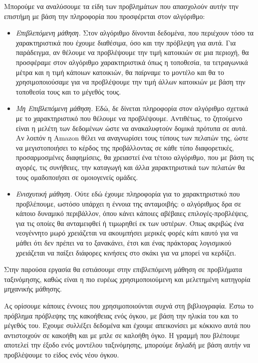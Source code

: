 \documentclass[11pt]{report}
\begin{document}
Μπορούμε να αναλύσουμε τα είδη των προβλημάτων που απασχολούν αυτήν την επιστήμη με βάση την πληροφορία που προσφέρεται στον αλγόριθμο:
\begin{itemize}
\item \textit{Επιβλεπόμενη μάθηση.} Στον αλγόριθμο δίνονται δεδομένα, που περιέχουν τόσο τα χαρακτηριστικά που έχουμε διαθέσιμα, όσο και την πρόβλεψη για αυτά. Για παράδειγμα, αν θέλουμε να προβλέψουμε την τιμή κατοικιών σε μια περιοχή, θα προσφέραμε στον αλγόριθμο χαρακτηριστικά όπως η τοποθεσία, τα τετραγωνικά μέτρα και η τιμή κάποιων κατοικιών, θα παίρναμε το μοντέλο και θα το χρησιμοποιούσαμε για να προβλέψουμε την τιμή άλλων κατοικιών με βάση την τοποθεσία τους και το μέγεθός τους.
\item \textit{Μη Επιβλεπόμενη μάθηση.} Εδώ, δε δίνεται πληροφορία στον αλγόριθμο σχετικά με το χαρακτηριστικό που θέλουμε να προβλέψουμε. Αντιθέτως, το ζητούμενο είναι η μελέτη των δεδομένων ώστε να ανακαλυφτούν δομικά πρότυπα σε αυτά. Αν λοιπόν η Amazon θέλει να αναγνωρίσει τους τύπους των πελατών της, ώστε να μεγιστοποιήσει το κέρδος της προβάλλοντας σε κάθε τύπο διαφορετικές, προσαρμοσμένες διαφημίσεις, θα χρειαστεί ένα τέτοιο αλγόριθμο, που με βάση τις αγορές, τις συνήθειες, την καταγωγή και άλλα χαρακτηριστικά των πελατών θα τους
ομαδοποιήσει σε ομοιογενείς ομάδες.
\item \textit{Ενισχυτική μάθηση.} Ούτε εδώ έχουμε πληροφορία για το χαρακτηριστικό που προβλέπουμε, ωστόσο υπάρχει η έννοια της ανταμοιβής: ο αλγόριθμος δρα σε κάποιο δυναμικό περιβάλλον, όπου κάνει κάποιες αβέβαιες επιλογές-προβλέψεις, για τις οποίες θα ανταμειφθεί ή τιμωρηθεί εκ των υστέρων. Όπως ακριβώς ένα νεογέννητο μωρό χρειάζεται να ακουμπήσει μερικές φορές κάτι καυτό για να μάθει ότι δεν πρέπει να το ξανακάνει, έτσι και ένας πράκτορας λογισμικού χρειάζεται να παίξει διάφορες κινήσεις στο σκάκι για να μπορεί να κερδίζει.
\end{itemize}

Στην παρούσα εργασία θα εστιάσουμε στην επιβλεπόμενη μάθηση σε προβλήματα ταξινόμησης, καθώς είναι η πιο ευρέως χρησιμοποιούμενη και μελετημένη κατηγορία μηχανικής μάθησης.

Ας ορίσουμε κάποιες έννοιες που χρησιμοποιούνται συχνά στη βιβλιογραφία. Έστω το πρόβλημα πρόβλεψης της κακοήθειας ενός όγκου, με βάση την ηλικία του και το μέγεθός του. Έχουμε συλλέξει δεδομένα και έχουμε απεικονίσει με κόκκινο αυτά που αντιστοιχούν σε κακοήθη και με μπλε σε καλοήθη όγκο. Η γραμμή που βλέπουμε αποτελεί την έξοδο ενός μοντέλου ταξινόμησης, μπορούμε δηλαδή με βάση αυτήν να προβλέψουμε το είδος ενός νέου όγκου.
\end{document}
